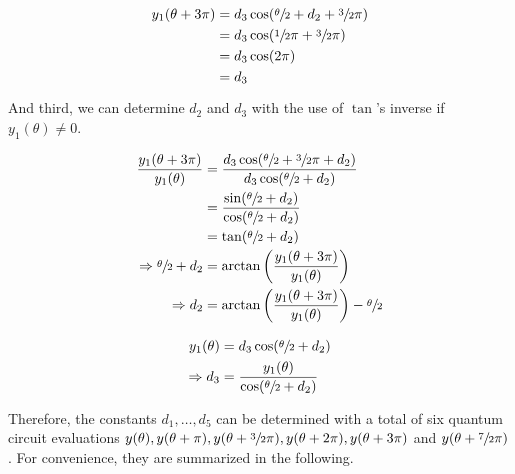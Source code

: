 \begin{equation}
    \label{eq:whateverman2-the-second}
    \begin{split}
        y_1(\theta + 3\pi)
            &= d_3 \cos(\sfrac\theta2 + d_2 + \sfrac32\pi)\\
            &= d_3 \cos(\sfrac12\pi + \sfrac32\pi)\\
            &= d_3 \cos(2\pi)\\
            &= d_3
    \end{split}
\end{equation}

And third, we can determine $d_2$ and $d_3$ with the use of $\tan$'s inverse if
$y_1(\theta) \neq 0$.

\begin{equation}
    \label{eq:d2}
    \begin{split}
        \frac{y_1(\theta + 3\pi)}{y_1(\theta)}
            &= \frac{d_3 \cos(\sfrac\theta2 + \sfrac32 \pi + d_2)}{d_3 \cos(\sfrac\theta2 + d_2)} \\
            &= \frac{\sin(\sfrac\theta2 + d_2)}{\cos(\sfrac\theta2 + d_2)} \\
            &= \tan(\sfrac\theta2 + d_2) \\
        \Rightarrow \sfrac\theta2 + d_2
            &= \arctan\left(\frac{y_1(\theta + 3\pi)}{y_1(\theta)}\right) \\
        \Rightarrow d_2
            &= \arctan\left(\frac{y_1(\theta + 3\pi)}{y_1(\theta)}\right) - \sfrac\theta2
    \end{split}
\end{equation}

\begin{equation}
    \label{eq:d3}
    \begin{split}
        y_1(\theta)
            &= d_3 \cos(\sfrac\theta2 + d_2) \\
        \Rightarrow d_3
            &= \frac{y_1(\theta)}{\cos(\sfrac\theta2 + d_2)}
    \end{split}
\end{equation}

Therefore, the constants $d_1, \dots, d_5$ can be determined with a total of six
quantum circuit evaluations
$y(\theta), y(\theta + \pi), y(\theta + \sfrac32\pi), y(\theta + 2\pi), y(\theta + 3\pi)$
and $y(\theta + \sfrac72\pi)$.
For convenience, they are summarized in the following.

